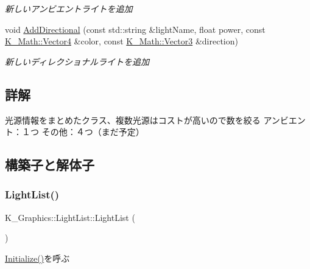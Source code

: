 \begin{DoxyCompactItemize}
\begin{DoxyCompactList}\small\item\em 新しいアンビエントライトを追加 \end{DoxyCompactList}\item 
void \mbox{\hyperlink{class_k___graphics_1_1_light_list_a6374cf237f3d50a0ef1a36d32a439da3}{Add\+Directional}} (const std\+::string \&light\+Name, float power, const \mbox{\hyperlink{namespace_k___math_a8d82de9de17eae460600de1e40e8a01f}{K\+\_\+\+Math\+::\+Vector4}} \&color, const \mbox{\hyperlink{namespace_k___math_a66884d78082c39ada4091c211f3570f8}{K\+\_\+\+Math\+::\+Vector3}} \&direction)
\begin{DoxyCompactList}\small\item\em 新しいディレクショナルライトを追加 \end{DoxyCompactList}\end{DoxyCompactItemize}


\subsection{詳解}
光源情報をまとめたクラス、複数光源はコストが高いので数を絞る アンビエント：１つ その他：４つ（まだ予定） 

\subsection{構築子と解体子}
\mbox{\label{class_k___graphics_1_1_light_list_a9a93f06156dd12df543b69b5bf0e37b5}} 
\subsubsection{\texorpdfstring{Light\+List()}{LightList()}}
{\footnotesize\ttfamily K\+\_\+\+Graphics\+::\+Light\+List\+::\+Light\+List (\begin{DoxyParamCaption}{ }\end{DoxyParamCaption})}



\mbox{\hyperlink{class_k___graphics_1_1_light_list_a00bcfff4cd52816b2eb31b8a55c6e1b3}{Initialize()}}を呼ぶ 

\mbox{\label{class_k___graphics_1_1_light_list_af8d54a762741383c985ca62175b11b55}} 
